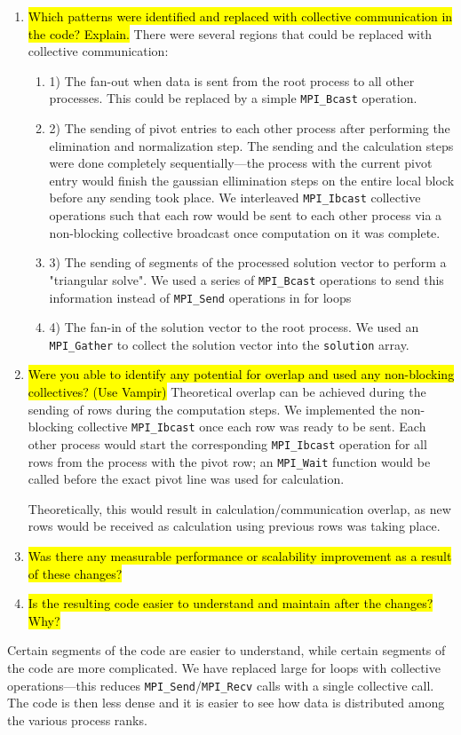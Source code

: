 \begin{enumerate}
	\item \hl{Which patterns were identified and replaced with collective communication in the code? Explain.}
	There were several regions that could be replaced with collective communication:
	\begin{enumerate}
	\item 1) The fan-out when data is sent from the root process to all other processes. This could be replaced by a simple \verb!MPI_Bcast! operation. 
	
	\item 2) The sending of pivot entries to each other process after performing the elimination and normalization step. The sending and the calculation steps were done completely sequentially---the process with the current pivot entry would finish the gaussian ellimination steps on the entire local block before any sending took place. We interleaved \verb!MPI_Ibcast! collective operations such that each row would be sent to each other process via a non-blocking collective broadcast once computation on it was complete.
	
	\item 3) The sending of segments of the processed solution vector to perform a "triangular solve". We used a series of \verb!MPI_Bcast! operations to send this information instead of \verb!MPI_Send! operations in for loops
	
	\item 4) The fan-in of the solution vector to the root process. We used an \verb!MPI_Gather! to collect the solution vector into the \verb!solution! array.
	
	\end{enumerate}
	\item \hl{Were you able to identify any potential for overlap and used any non-blocking collectives? (Use Vampir)}	
	Theoretical overlap can be achieved during the sending of rows during the computation steps. We implemented the non-blocking collective \verb!MPI_Ibcast! once each row was ready to be sent. Each other process would start the corresponding \verb!MPI_Ibcast! operation for all rows from the process with the pivot row; an \verb!MPI_Wait! function would be called before the exact pivot line was used for calculation.
	
	Theoretically, this would result in calculation/communication overlap, as new rows would be received as calculation using previous rows was taking place.
	
	
	\item \hl{Was there any measurable performance or scalability improvement as a result of these changes?}		
	
	\item \hl{Is the resulting code easier to understand and maintain after the changes? Why?}	
\end{enumerate}
	Certain segments of the code are easier to understand, while certain segments of the code are more complicated. We have replaced large for loops with collective operations---this reduces \verb!MPI_Send!/\verb!MPI_Recv! calls with a single collective call. The code is then less dense and it is easier to see how data is distributed among the various process ranks.
	
